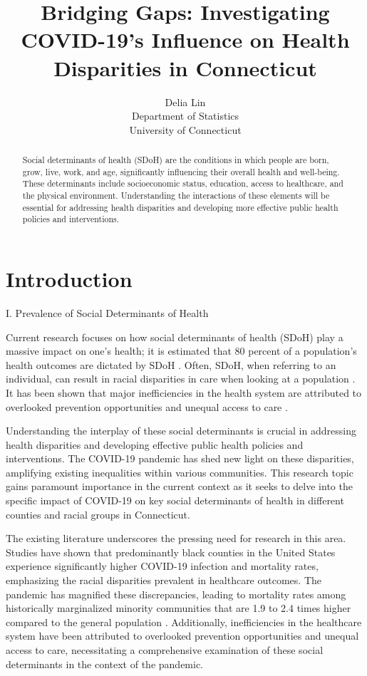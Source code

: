 \documentclass[12pt]{article}
\title{Bridging Gaps: Investigating COVID-19's Influence on Health Disparities in Connecticut}
\author{Delia Lin\\
  Department of Statistics\\
  University of Connecticut
}
\begin{document}
\maketitle

\begin{abstract}
  Social determinants of health (SDoH) are the conditions in which people are born, 
  grow, live, work, and age, significantly influencing their overall health and well-being. 
  These determinants include socioeconomic status, education, access to healthcare, and the 
  physical environment. Understanding the interactions of these elements will be essential for 
  addressing health disparities and developing more effective public health policies and interventions.
\end{abstract}

\section{Introduction}\label{sec:intro}

I. Prevalence of Social Determinants of Health 

Current research focuses on how social determinants of health (SDoH) play a massive
impact on one's health; it is estimated that 80 percent of a population's health outcomes are 
dictated by SDoH 
\citep{HOOD2016129}
. Often, SDoH, when referring to an individual, can result in racial 
disparities in care when looking at a population
\citep{Monroe2023-uq}
. It has been shown that major inefficiencies
in the health system are attributed to overlooked prevention opportunities and unequal access
to care
\citep{Allin2014-xn}.

Understanding the interplay of these social determinants is crucial in addressing health disparities 
and developing effective public health policies and interventions. The COVID-19 pandemic has shed new light on 
these disparities, amplifying existing inequalities within various communities. This research topic gains paramount 
importance in the current context as it seeks to delve into the specific impact of COVID-19 on key social determinants 
of health in different counties and racial groups in Connecticut.

The existing literature underscores the pressing need for research in this area. Studies have shown that predominantly 
black counties in the United States experience significantly higher COVID-19 infection and mortality rates, emphasizing 
the racial disparities prevalent in healthcare outcomes. The pandemic has magnified these discrepancies, leading to 
mortality rates among historically marginalized minority communities that are 1.9 to 2.4 times higher compared to the 
general population \citep{Badalov2022-wt}. Additionally, inefficiencies in the healthcare system have been attributed 
to overlooked prevention opportunities and unequal access to care, necessitating a comprehensive examination 
of these social determinants in the context of the pandemic.
\end{document}

